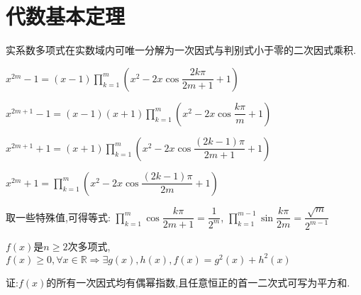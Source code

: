 \section{代数基本定理}
实系数多项式在实数域内可唯一分解为一次因式与判别式小于零的二次因式乘积.

$ x^{2m}-1=(x-1) \prod_{k=1}^m{( x^2-2x\cos\dfrac{2k\pi}{2m+1}+1 )}$

$ x^{2m+1}-1 =(x-1)(x+1)\prod_{k=1}^m{(x^2-2x\cos\dfrac{k\pi}{m}+1)}$ 

$ x^{2m+1}+1=(x+1)\prod_{k=1}^m{( x^2-2x\cos\dfrac{(2k-1)\pi}{2m+1}+1 )}$

$ x^{2m}+1=\prod_{k=1}^m{(x^2-2x\cos\dfrac{(2k-1)\pi}{2m}+1)}$

取一些特殊值,可得等式:
$ \prod_{k=1}^m{\cos\dfrac{k\pi}{2m+1}}=\dfrac{1}{2^m}$,
$ \prod_{k=1}^{m-1}{\sin\dfrac{k\pi}{2m}}=\dfrac{\sqrt{m}}{2^{m-1}}$


$ f(x)$是$ n\ge2$次多项式,$ f(x)\ge 0,\forall x\in \mathbb{R}\Rightarrow \exists g(x),h(x),f(x)=g^2(x)+h^2(x)$

证:$ f(x)$的所有一次因式均有偶幂指数,且任意恒正的首一二次式可写为平方和.
